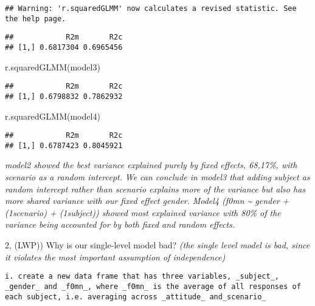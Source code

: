 \documentclass[
]{article}
\newenvironment{Shaded}{\begin{snugshade}}{\end{snugshade}}
\newcommand{\FunctionTok}[1]{\textcolor[rgb]{0.00,0.00,0.00}{#1}}
\newcommand{\NormalTok}[1]{#1}
\begin{document}
\begin{verbatim}
## Warning: 'r.squaredGLMM' now calculates a revised statistic. See the help page.
\end{verbatim}

\begin{verbatim}
##            R2m       R2c
## [1,] 0.6817304 0.6965456
\end{verbatim}

\begin{Shaded}
\begin{Highlighting}[]
\FunctionTok{r.squaredGLMM}\NormalTok{(model3)}
\end{Highlighting}
\end{Shaded}

\begin{verbatim}
##            R2m       R2c
## [1,] 0.6798832 0.7862932
\end{verbatim}

\begin{Shaded}
\begin{Highlighting}[]
\FunctionTok{r.squaredGLMM}\NormalTok{(model4)}
\end{Highlighting}
\end{Shaded}

\begin{verbatim}
##            R2m       R2c
## [1,] 0.6787423 0.8045921
\end{verbatim}

\emph{model2 showed the best variance explained purely by fixed effects,
68,17\%, with scenario as a random intercept.} \emph{We can conclude in
model3 that adding subject as random intercept rather than scenario
explains more of the variance but also has more shared variance with our
fixed effect gender.} \emph{Model4 (f0mn \textasciitilde{} gender +
(1\textbar scenario) + (1\textbar subject)) showed most explained
variance with 80\% of the variance being accounted for by both fixed and
random effects.}

2, (LWP)) Why is our single-level model bad? \emph{(the single level
model is bad, since it violates the most important assumption of
independence)}

\begin{verbatim}
i. create a new data frame that has three variables, _subject_, _gender_ and _f0mn_, where _f0mn_ is the average of all responses of each subject, i.e. averaging across _attitude_ and_scenario_
\end{verbatim}
\end{document}
